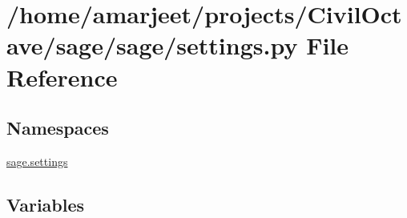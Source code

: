 \hypertarget{a00022}{}\section{/home/amarjeet/projects/\+Civil\+Octave/sage/sage/settings.py File Reference}
\label{a00022}
\subsection*{Namespaces}
\begin{DoxyCompactItemize}
\item 
 \hyperlink{a00043}{sage.\+settings}
\end{DoxyCompactItemize}
\subsection*{Variables}
